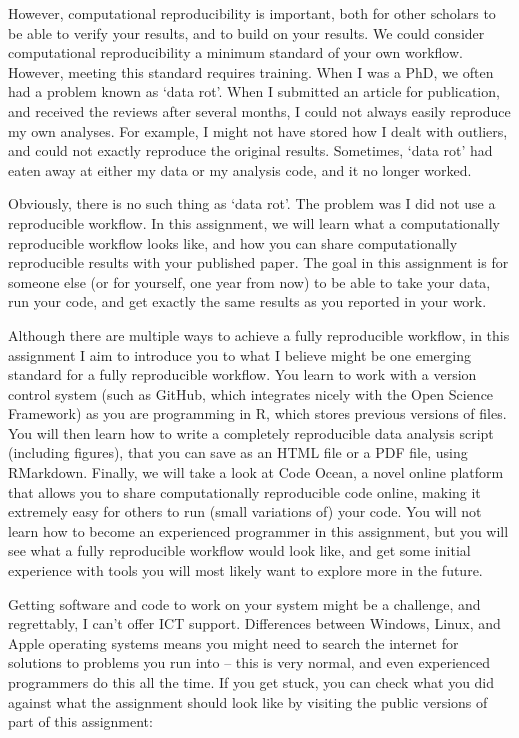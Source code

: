 \documentclass[
  oneside]{book}
\begin{document}
However, computational reproducibility is important, both for other scholars to
be able to verify your results, and to build on your results. We could consider
computational reproducibility a minimum standard of your own workflow. However,
meeting this standard requires training. When I was a PhD, we often had a
problem known as `data rot'. When I submitted an article for publication, and
received the reviews after several months, I could not always easily reproduce
my own analyses. For example, I might not have stored how I dealt with outliers,
and could not exactly reproduce the original results. Sometimes, `data rot' had
eaten away at either my data or my analysis code, and it no longer worked.

Obviously, there is no such thing as `data rot'. The problem was I did not use a
reproducible workflow. In this assignment, we will learn what a computationally
reproducible workflow looks like, and how you can share computationally
reproducible results with your published paper. The goal in this assignment is
for someone else (or for yourself, one year from now) to be able to take your
data, run your code, and get exactly the same results as you reported in your
work.

Although there are multiple ways to achieve a fully reproducible workflow, in
this assignment I aim to introduce you to what I believe might be one emerging
standard for a fully reproducible workflow. You learn to work with a version
control system (such as GitHub, which integrates nicely with the Open Science
Framework) as you are programming in R, which stores previous versions of files.
You will then learn how to write a completely reproducible data analysis script
(including figures), that you can save as an HTML file or a PDF file, using
RMarkdown. Finally, we will take a look at Code Ocean, a novel online platform
that allows you to share computationally reproducible code online, making it
extremely easy for others to run (small variations of) your code. You will not
learn how to become an experienced programmer in this assignment, but you will
see what a fully reproducible workflow would look like, and get some initial
experience with tools you will most likely want to explore more in the future.

Getting software and code to work on your system might be a challenge, and
regrettably, I can't offer ICT support. Differences between Windows, Linux, and
Apple operating systems means you might need to search the internet for
solutions to problems you run into -- this is very normal, and even experienced
programmers do this all the time. If you get stuck, you can check what you did
against what the assignment should look like by visiting the public versions of
part of this assignment:
\end{document}
